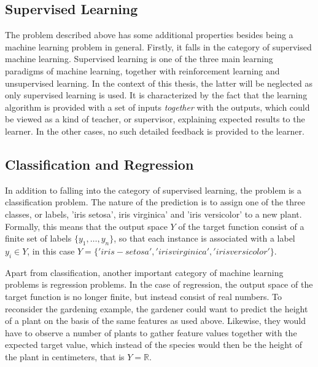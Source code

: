 
\subsection{Supervised Learning}
The problem described above has some additional properties besides being a machine learning problem in general. Firstly, it falls in the category of supervised machine learning. Supervised learning is one of the three main learning paradigms of machine learning, together with reinforcement learning and unsupervised learning. In the context of this thesis, the latter will be neglected as only supervised learning is used. It is characterized by the fact that the learning algorithm is provided with a set of inputs \textit{together} with the outputs, which could be viewed as a kind of teacher, or supervisor, explaining expected results to the learner. In the other cases, no such detailed feedback is provided to the learner. 

\subsection{Classification and Regression}
In addition to falling into the category of supervised learning, the problem is a classification problem. The nature of the prediction is to assign one of the three classes, or labels, 'iris setosa', iris virginica' and 'iris versicolor' to a new plant. Formally, this means that the output space $Y$ of the target function consist of a finite set of labels $\lbrace y_1,\dots,y_n\rbrace$, so that each instance is associated with a label $y_i \in Y$, in this case $Y=\lbrace 'iris-setosa','iris virginica', 'iris versicolor' \rbrace $. 

Apart from classification, another important category of machine learning problems is regression problems. In the case of regression, the output space of the target function is no longer finite, but instead consist of real numbers. To reconsider the gardening example, the gardener could want to predict the height of a plant on the basis of the same features as used above. Likewise, they would have to observe a number of plants to gather feature values together with the expected target value, which instead of the species would then be the height of the plant in centimeters, that is $Y=\mathbb{R}$.

